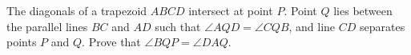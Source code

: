 The diagonals of a trapezoid $ ABCD$ intersect at point $ P$. Point $ Q$ lies between the parallel lines $ BC$ and $ AD$ such that $ \angle AQD = \angle CQB$,  and line $ CD$ separates points $ P$ and $ Q$. Prove that $ \angle BQP = \angle DAQ$.